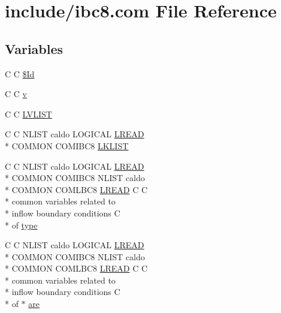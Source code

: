 \hypertarget{ibc8_8com}{\section{include/ibc8.com File Reference}
\label{ibc8_8com}
}
\subsection*{Variables}
\begin{DoxyCompactItemize}
\item 
C C \hyperlink{ibc8_8com_af40bd3a96fc1553c00422342f92046b8}{\$\-Id}
\item 
C C \hyperlink{ibc8_8com_a8961853e9a171af64fe80e35da93a2e0}{v}
\item 
C C \hyperlink{ibc8_8com_aa711cf0c6b8e59731943e29410730275}{L\-V\-L\-I\-S\-T}
\item 
C C N\-L\-I\-S\-T caldo L\-O\-G\-I\-C\-A\-L \hyperlink{flags_8com_aea278b60e9a744704973b7b8aecd9442}{L\-R\-E\-A\-D} \\*
C\-O\-M\-M\-O\-N C\-O\-M\-I\-B\-C8 \hyperlink{ibc8_8com_ad61abb12bb3aea850116ed8eb2156f2b}{L\-K\-L\-I\-S\-T}
\item 
C C N\-L\-I\-S\-T caldo L\-O\-G\-I\-C\-A\-L \hyperlink{flags_8com_aea278b60e9a744704973b7b8aecd9442}{L\-R\-E\-A\-D} \\*
C\-O\-M\-M\-O\-N C\-O\-M\-I\-B\-C8 N\-L\-I\-S\-T caldo \\*
C\-O\-M\-M\-O\-N C\-O\-M\-L\-B\-C8 \hyperlink{flags_8com_aea278b60e9a744704973b7b8aecd9442}{L\-R\-E\-A\-D} C C \\*
common variables related to \\*
inflow boundary conditions C \\*
of \hyperlink{ibc8_8com_a631c5c1ddd478437aa8e7f1d42a3b59d}{type}
\item 
C C N\-L\-I\-S\-T caldo L\-O\-G\-I\-C\-A\-L \hyperlink{flags_8com_aea278b60e9a744704973b7b8aecd9442}{L\-R\-E\-A\-D} \\*
C\-O\-M\-M\-O\-N C\-O\-M\-I\-B\-C8 N\-L\-I\-S\-T caldo \\*
C\-O\-M\-M\-O\-N C\-O\-M\-L\-B\-C8 \hyperlink{flags_8com_aea278b60e9a744704973b7b8aecd9442}{L\-R\-E\-A\-D} C C \\*
common variables related to \\*
inflow boundary conditions C \\*
of $\ast$ \hyperlink{ibc8_8com_a7f7721a0bb3c1d35cfbfbcfd6efc1548}{are}
\end{DoxyCompactItemize}


